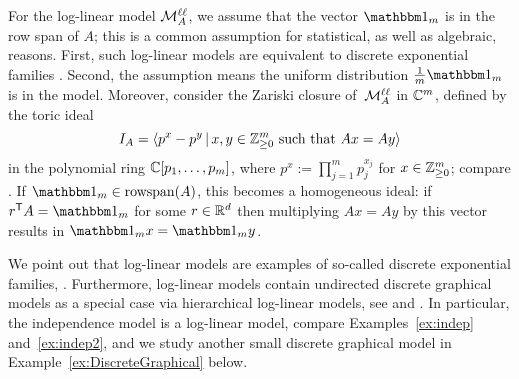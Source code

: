 \begin{remark} \label{rem:AssumptionAllOnes}
	For the log-linear model $\mathcal{M}^{\mathtt{\ell \ell}}_A$, we assume that the vector $\ones_m$ is in the row span of $A$; this is
	a common assumption for statistical, as well as algebraic, reasons. First, such log-linear models are equivalent to discrete exponential families \cite[Section 6.2]{SullivantBook}. Second, the assumption means the uniform distribution $\frac{1}{m}\ones_m$ is in the model. Moreover, consider the  Zariski closure of~$\mathcal{M}^{\mathtt{\ell \ell}}_A$ in $\mathbb C^m$, defined by the toric ideal
	\begin{equation}
		\label{eq:ZarMA}
		I_A = \langle p^x - p^y \, \vert \, x,y \in \mathbb Z_{\geq 0}^m \text{ such that } Ax = Ay \rangle 
	\end{equation}
	in the polynomial ring $\mathbb C[p_1,\dots,p_m]$, where $p^x := \prod_{j=1}^m p_j^{x_j}$ for $x \in \mathbb Z_{\geq 0}^m$; compare \cite[Proposition~6.2.4]{SullivantBook}.
	If $\ones_m \in \rsp(A)$, this becomes a homogeneous ideal: if $r\T A = \ones_m $ for some $r \in \mathbb R^d$ then multiplying $Ax = Ay$ by this vector results in $\ones_m x = \ones_m y$.
	\hfill\remSymbol
\end{remark}

We point out that log-linear models are examples of so-called discrete exponential families, \cite[Section~6.2]{SullivantBook}.
Furthermore, log-linear models contain undirected discrete graphical models as a special case via hierarchical log-linear models, see \cite{LauritzenBook} and \cite[Proposition~13.2.5]{SullivantBook}.  In particular, the independence model is a log-linear model, compare Examples~\ref{ex:indep} and~\ref{ex:indep2}, and we study another small discrete graphical model in Example~\ref{ex:DiscreteGraphical} below.

